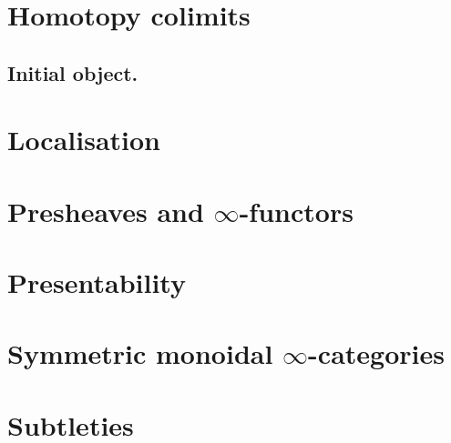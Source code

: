 \documentclass{article}
\numberwithin{equation}{subsection}
\renewcommand{\ss}[1]{\subsection{#1}}
\begin{document}
    \section{Homotopy colimits}

        \ss{Initial object.}

    \section{Localisation}

    \section{Presheaves and $\infty$-functors}

    \section{Presentability}

    \section{Symmetric monoidal $\infty$-categories}

    \section{Subtleties}
\end{document}

